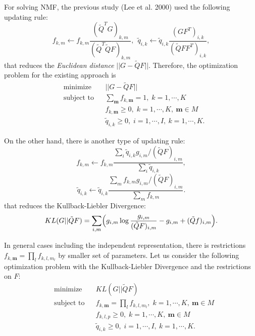 \documentclass{article}
\begin{document}
For solving NMF, 
the previous study (Lee et al. 2000) used the following updating rule:
\begin{equation*}
f_{k,m} \gets f_{k,m} \frac{ ( \tilde{Q}^T G)_{k,m} }{ ( \tilde{Q}^T \tilde{Q} F  )_{k,m} },\  \
\tilde{q}_{i,k} \gets \tilde{q}_{i,k}  \frac{ (G F^T)_{i,k} }{ ( \tilde{Q} F F^T )_{i,k} },
\end{equation*}
that reduces the {\it Euclidean distance} $|| G - \tilde{Q} F ||$. 
Therefore, the optimization problem for the existing approach is
\begin{equation}
\begin{aligned}
& \text{minimize}
& & ||G - \tilde{Q} F || \\
& \text{subject to}
& & \sum_{ \bm{m} } f_{k, \bm{m}} =  1, \; k = 1, \cdots, K \\ &
& & f_{k, \bm{m}} \geq 0, \; k = 1, \cdots, K,\ \bm{m} \in M \\ & 
& & \tilde{q}_{i, k} \geq 0, \; i = 1, \cdots, I,\ k = 1, \cdots, K.
\end{aligned}
\end{equation}

On the other hand, there is another type of updating rule:
\begin{equation*}
f_{k,m} \gets f_{k,m} \frac{ \sum_i \tilde{q}_{i,k} g_{i,m} / ( \tilde{Q} F)_{i,m} }{ \sum_i \tilde{q}_{i,k} },
\end{equation*}
\begin{equation*}
\tilde{q}_{i,k} \gets \tilde{q}_{i,k}  \frac{ \sum_m f_{k,m} g_{i,m} / ( \tilde{Q} F)_{i,m} }{ \sum_m f_{k,m} }.
\end{equation*}
that reduces the Kullback-Liebler Divergence:
\begin{equation*}
KL(G ||  \tilde{Q} F) = \sum_{i,m} \Bigl( g_{i,m} \log  \frac{ g_{i,m} }{ (\tilde{Q} F)_{i,m} } - g_{i,m} + ( \tilde{Q} f )_{i,m} \Bigr).
\end{equation*}

In general cases including the independent representation, 
there is restrictions $f_{k, \bm{m}} = \prod_l f_{k, l, m_l}$ by smaller set of parameters.
Let us consider the following optimization problem with the Kullback-Liebler Divergence and the restrictions on $F$:
\begin{equation}
\begin{aligned}
& \text{minimize}
& & KL(G ||  \tilde{Q} F) \\
& \text{subject to}
& & f_{k, \bm{m}} = \prod_l f_{k, l, m_l}, \; k = 1, \cdots, K,\ \bm{m} \in M \\ & 
& & f_{k, l, p} \geq 0, \; k = 1, \cdots, K,\ \bm{m} \in M \\ & 
& & \tilde{q}_{i, k} \geq 0, \; i = 1, \cdots, I,\ k = 1, \cdots, K.
\end{aligned}
\label{KL}
\end{equation}
\end{document}
